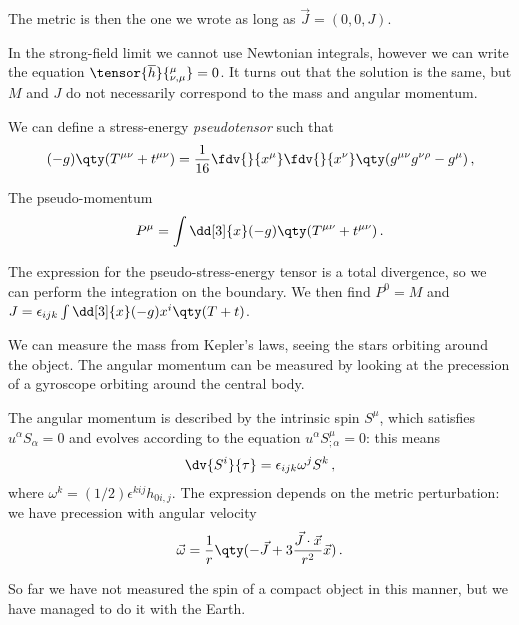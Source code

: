 \documentclass[main.tex]{subfiles}
\begin{document}
The metric is then the one we wrote as long as \(\vec{J} = (0, 0, J)\). 

In the strong-field limit we cannot use Newtonian integrals, however we can write the equation \(\tensor{\overline{h}}{^{\mu }_{\nu , \mu} } = 0\). It turns out that the solution is the same, but \(M\) and \(J\) do not necessarily correspond to the mass and angular momentum. 

We can define a stress-energy \emph{pseudotensor} such that 
%
\begin{align}
(-g) \qty(T^{\mu \nu } + t^{\mu \nu }) = \frac{1}{16} \fdv{}{x^{\mu } } \fdv{}{x^{\nu }} \qty(g^{\mu \nu } g^{\nu \rho } - g^{\mu })
\,,
\end{align}
%

The pseudo-momentum 
%
\begin{align}
P^{\mu } = \int \dd[3]{x} (-g) \qty(T^{\mu \nu } + t^{\mu \nu })
\,.
\end{align}

The expression for the pseudo-stress-energy tensor is a total divergence, so we can perform the integration on the boundary. We then find \(P^{0}= M\) and \(J = \epsilon_{ijk} \int \dd[3]{x} (-g) x^{i} \qty(T + t)\). 

We can measure the mass from Kepler's laws, seeing the stars orbiting around the object. 
The angular momentum can be measured by looking at the precession of a gyroscope orbiting around the central body.

The angular momentum is described by the intrinsic spin \(S^{\mu }\), which satisfies \(u^{\alpha } S_{\alpha } = 0\) and evolves according to the equation \(u^{\alpha } S^{\mu }_{; \alpha } = 0\): this means 
%
\begin{align}
\dv{S^{i}}{\tau } = \epsilon_{ijk} \omega ^{j} S^{k}
\,,
\end{align}
%
where \(\omega^{k} = (1/2) \epsilon^{kij} h_{0i,j}\). 
The expression depends on the metric perturbation: we have precession with angular velocity 
%
\begin{align}
\vec{\omega} = \frac{1}{r} \qty(- \vec{J} + 3\frac{\vec{J} \cdot \vec{x}}{r^2} \vec{x})
\,.
\end{align}

So far we have not measured the spin of a compact object in this manner, but we have managed to do it with the Earth.  
\end{document}
